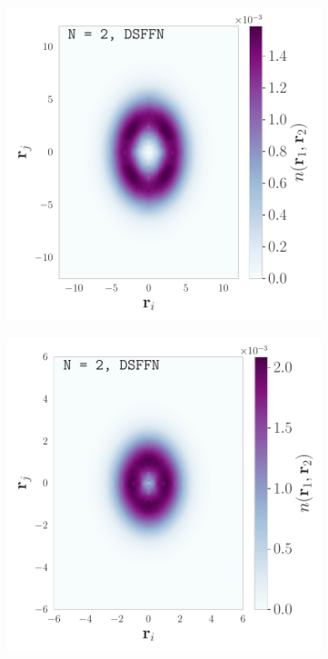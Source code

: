 \begin{figure}[H]
    \centering
    \begin{subfigure}[t]{0.32\textwidth}
        \centering
        \includegraphics[width=\textwidth]{Chapters/Results/dots/two_body_density_N[2]_nqs_DSFFN_0.1.pdf}
        \label{fig:sub1}
    \end{subfigure}
    \begin{subfigure}[t]{0.32\textwidth}
        \centering
        \includegraphics[width=\textwidth]{Chapters/Results/dots/two_body_density_N[2]_nqs_DSFFN_0.5.pdf}

\end{subfigure}
\end{figure}
